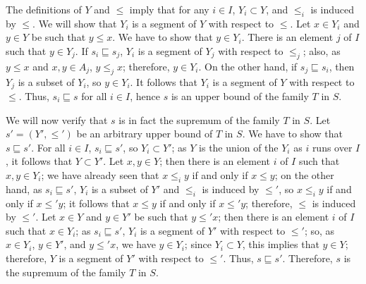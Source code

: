 \documentclass{article}
\begin{document}
\begin{solution}[\ref{exe:mfln3otu}]
  The definitions of \(Y\) and \(\leq\) imply that for any
  \(i \in I\), \(Y_i \subset Y\), and \(\leq_i\) is induced by
  \(\leq\).  We will show that \(Y_i\) is a segment of \(Y\) with
  respect to \(\leq\).  Let \(x \in Y_i\) and \(y \in Y\) be such that
  \(y \leq x\).  We have to show that \(y \in Y_i\).  There is an
  element \(j\) of \(I\) such that \(y \in Y_j\).  If
  \(s_i \sqsubseteq s_j\), \(Y_i\) is a segment of \(Y_j\) with
  respect to \(\leq_j\); also, as \(y \leq x\) and \(x, y \in A_j\),
  \(y \leq_j x\); therefore, \(y \in Y_i\).  On the other hand, if
  \(s_j \sqsubseteq s_i\), then \(Y_j\) is a subset of \(Y_i\), so
  \(y \in Y_i\).  It follows that \(Y_i\) is a segment of \(Y\) with
  respect to \(\leq\).  Thus, \(s_i \sqsubseteq s\) for all
  \(i \in I\), hence \(s\) is an upper bound of the family \(T\) in
  \(S\).

  We will now verify that \(s\) is in fact the supremum of the family
  \(T\) in \(S\).  Let \(s' = (Y', \leq')\) be an arbitrary upper
  bound of \(T\) in \(S\).  We have to show that \(s \sqsubseteq s'\).
  For all \(i \in I\), \(s_i \sqsubseteq s'\), so \(Y_i \subset Y'\);
  as \(Y\) is the union of the \(Y_i\) as \(i\) runs over \(I\), it
  follows that \(Y \subset Y'\).  Let \(x, y \in Y\); then there is an
  element \(i\) of \(I\) such that \(x, y \in Y_i\); we have already
  seen that \(x \leq_i y\) if and only if \(x \leq y\); on the other
  hand, as \(s_i \sqsubseteq s'\), \(Y_i\) is a subset of \(Y'\) and
  \(\leq_i\) is induced by \(\leq'\), so \(x \leq_i y\) if and only if
  \(x \leq' y\); it follows that \(x \leq y\) if and only if
  \(x \leq' y\); therefore, \(\leq\) is induced by \(\leq'\).  Let
  \(x \in Y\) and \(y \in Y'\) be such that \(y \leq' x\); then there
  is an element \(i\) of \(I\) such that \(x \in Y_i\); as
  \(s_i \sqsubseteq s'\), \(Y_i\) is a segment of \(Y'\) with respect
  to \(\leq'\); so, as \(x \in Y_i\), \(y \in Y'\), and \(y \leq' x\),
  we have \(y \in Y_i\); since \(Y_i \subset Y\), this implies that
  \(y \in Y\); therefore, \(Y\) is a segment of \(Y'\) with respect to
  \(\leq'\).  Thus, \(s \sqsubseteq s'\).  Therefore, \(s\) is the
  supremum of the family \(T\) in \(S\).
\end{solution}
\end{document}
